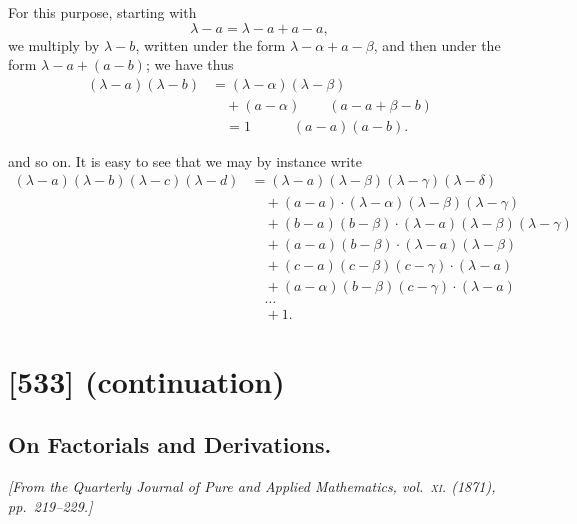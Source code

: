 \documentclass[11pt,a4paper]{book}
\begin{document}
For this purpose, starting with
\[
\lambda - a = \lambda - a + a - a,
\]
we multiply by $\lambda - b$, written under the form $\lambda - \alpha + a - \beta$, and then under the
form $\lambda - a + (a - b)$; we have thus
\begin{align*}
(\lambda - a)(\lambda - b) &= (\lambda - \alpha)(\lambda - \beta) \\
&\quad + (a - \alpha)\quad\quad (a - a + \beta - b) \\
&\quad = 1 \quad\quad\quad (a - a)(a - b).
\end{align*}

and so on. It is easy to see that we may by instance write
\begin{align*}
(\lambda - a)(\lambda - b)(\lambda - c)(\lambda - d) &= (\lambda - a)(\lambda - \beta)(\lambda - \gamma)(\lambda - \delta) \\
&\quad + (a - a) \cdot (\lambda - \alpha)(\lambda - \beta)(\lambda - \gamma) \\
&\quad + (b - a)(b - \beta) \cdot (\lambda - a)(\lambda - \beta)(\lambda - \gamma) \\
&\quad + (a - a)(b - \beta) \cdot (\lambda - a)(\lambda - \beta) \\
&\quad + (c - a)(c - \beta)(c - \gamma)\cdot (\lambda - a) \\
&\quad + (a - \alpha)(b - \beta)(c - \gamma)\cdot (\lambda - a) \\
&\quad\dots \\
&\quad + 1.
\end{align*}

\clearpage
\clearpage


\section{[533] (continuation)}
\subsection{On Factorials and Derivations.}

\begin{center}
\textit{[From the Quarterly Journal of Pure and Applied Mathematics, vol.~\textsc{xi}. (1871), pp.~219--229.]}
\end{center}
\end{document}
